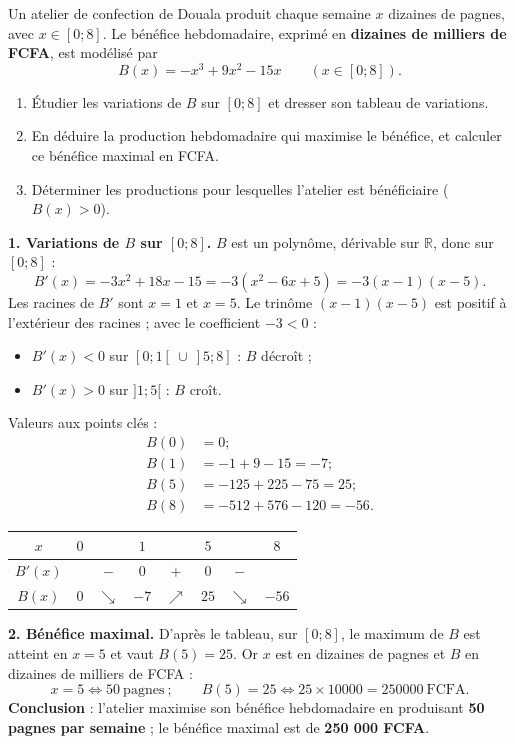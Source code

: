 \documentclass[11pt]{article}
\begin{document}
\begin{exoresolu}
Un atelier de confection de Douala produit chaque semaine $x$ dizaines de pagnes, avec $x\in[0;8]$. Le bénéfice hebdomadaire, exprimé en \textbf{dizaines de milliers de FCFA}, est modélisé par
\[
B(x)=-x^3+9x^2-15x \qquad (x\in[0;8]).
\]
\begin{enumerate}
\item Étudier les variations de $B$ sur $[0;8]$ et dresser son tableau de variations.
\item En déduire la production hebdomadaire qui maximise le bénéfice, et calculer ce bénéfice maximal en FCFA.
\item Déterminer les productions pour lesquelles l'atelier est bénéficiaire ($B(x)>0$).
\end{enumerate}
\tcblower
\textbf{1. Variations de $B$ sur $[0;8]$.} $B$ est un polynôme, dérivable sur $\mathbb{R}$, donc sur $[0;8]$ :
\[
B'(x)=-3x^2+18x-15=-3(x^2-6x+5)=-3(x-1)(x-5).
\]
Les racines de $B'$ sont $x=1$ et $x=5$. Le trinôme $(x-1)(x-5)$ est positif à l'extérieur des racines ; avec le coefficient $-3<0$ :
\begin{itemize}
\item $B'(x)<0$ sur $[0;1[\ \cup\ ]5;8]$ : $B$ décroît ;
\item $B'(x)>0$ sur $]1;5[$ : $B$ croît.
\end{itemize}
Valeurs aux points clés :
\begin{align*}
B(0)&=0 ;\\
B(1)&=-1+9-15=-7 ;\\
B(5)&=-125+225-75=25 ;\\
B(8)&=-512+576-120=-56.
\end{align*}
\begin{center}
\begin{tabular}{|c|ccccccc|}
\hline
$x$ & $0$ & & $1$ & & $5$ & & $8$ \\
\hline
$B'(x)$ & & $-$ & $0$ & $+$ & $0$ & $-$ & \\
\hline
$B(x)$ & $0$ & $\searrow$ & $-7$ & $\nearrow$ & $25$ & $\searrow$ & $-56$ \\
\hline
\end{tabular}
\end{center}

\textbf{2. Bénéfice maximal.} D'après le tableau, sur $[0;8]$, le maximum de $B$ est atteint en $x=5$ et vaut $B(5)=25$.
Or $x$ est en dizaines de pagnes et $B$ en dizaines de milliers de FCFA :
\[
x=5 \iff 50\ \text{pagnes} \ ;\qquad B(5)=25 \iff 25\times \num{10000}=\num{250000}\ \text{FCFA}.
\]
\textbf{Conclusion} : l'atelier maximise son bénéfice hebdomadaire en produisant \textbf{50 pagnes par semaine} ; le bénéfice maximal est de \textbf{250 000 FCFA}.


\end{exoresolu}
\end{document}
